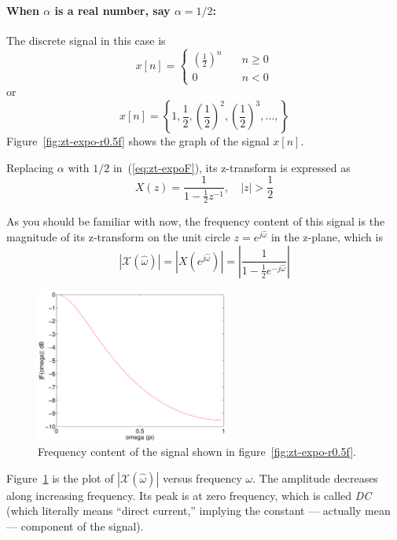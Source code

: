 \paragraph*{When $\alpha$ is a real number, say $\alpha=1/2$:}
The discrete signal in this case is 
\begin{equation}
x[n] = \left\{\begin{array}{ll}
                        \left(\frac{1}{2}\right)^n & \quad  n \ge 0 \\
                        0             & \quad n < 0
          \end{array}\right.
\end{equation}
or
\begin{equation}
x[n] = \left\{1, \frac{1}{2}, \left(\frac{1}{2}\right)^2,
        \left(\frac{1}{2}\right)^3, \ldots, \right\}
\end{equation}
Figure~\ref{fig:zt-expo-r0.5f} shows the graph of the signal $x[n]$.

Replacing $\alpha$ with $1/2$ in~(\ref{eq:zt-expoF}), its
z-transform is expressed as
\begin{equation}
X(z)=\frac{1}{1-\frac{1}{2}z^{-1}}, \quad |z|>\frac{1}{2}
\end{equation}

As you should be familiar with now, the frequency content of this
signal is the magnitude of its z-transform on the unit circle
$z=e^{j\hat{\omega}}$ in the z-plane, which is
\begin{equation}
|\mathcal{X}(\hat{\omega})|=|X(e^{j\hat{\omega}})|
           =\left|\frac{1}{1-\frac{1}{2}e^{-j\hat{\omega}}}\right|
\end{equation}

\begin{figure}
\centerline{\includegraphics[width=2.5in]{ch-conv/zt_expo_r0-5F}}
\caption{Frequency content of the signal shown
in figure~\protect\ref{fig:zt-expo-r0.5f}.
\label{fig:zt-expo-r0.5F}}
\end{figure}

Figure~\ref{fig:zt-expo-r0.5F} is the plot of
$|\mathcal{X}(\hat{\omega})|$ versus frequency $\omega$.  The
amplitude decreases along increasing frequency. Its peak is at zero
frequency, which is called \emph{DC} (which literally means ``direct
current,'' implying the constant --- actually mean --- component of
the signal).

